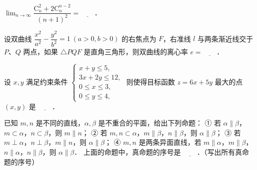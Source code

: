 \begin{question}
$\lim_{n \to \infty} \dfrac{\mathrm{C}_n^2 + 2\mathrm{C}_n^{n-2}}{(n+1)^2} = \underline{\hspace{2em}}$．

\end{question}
\begin{question}
设双曲线 $\dfrac{x^2}{a^2} - \dfrac{y^2}{b^2} = 1\ (a > 0, b > 0)$ 的右焦点为 $F$，右准线 $l$ 与两条渐近线交于 $P$、$Q$ 两点，如果 $\triangle PQF$ 是直角三角形，则双曲线的离心率 $e = \underline{\hspace{2em}}$．

\end{question}
\begin{question}
设 $x, y$ 满足约束条件 $\begin{cases} x + y \leqslant 5, \\ 3x + 2y \leqslant 12, \\ 0 \leqslant x \leqslant 3, \\ 0 \leqslant y \leqslant 4, \end{cases}$ 则使得目标函数 $z = 6x + 5y$ 最大的点 $(x, y)$ 是 $\underline{\hspace{2em}}$．

\end{question}
\begin{question}
已知 $m, n$ 是不同的直线，$\alpha, \beta$ 是不重合的平面，给出下列命题：
① 若 $\alpha \parallel \beta$，$m \subset \alpha$，$n \subset \beta$，则 $m \parallel n$；
② 若 $m, n \subset \alpha$，$m \parallel \beta$，$n \parallel \beta$，则 $\alpha \parallel \beta$；
③ 若 $m \perp \alpha$，$n \perp \beta$，$m \parallel n$，则 $\alpha \parallel \beta$；
④ $m, n$ 是两条异面直线，若 $m \parallel \alpha$，$m \parallel \beta$，$n \parallel \alpha$，$n \parallel \beta$，则 $\alpha \parallel \beta$．
上面的命题中，真命题的序号是 $\underline{\hspace{2em}}$．（写出所有真命题的序号）

\end{question}

